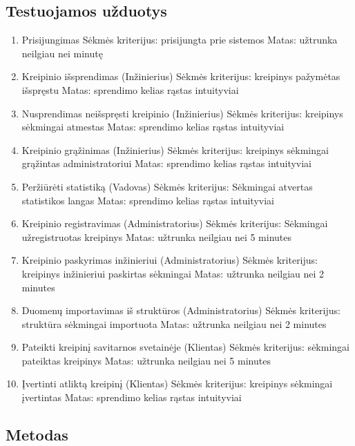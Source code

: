 	\subsection{Testuojamos užduotys}
	
		\begin{enumerate}
			\item Prisijungimas
				\subitem Sėkmės kriterijus: prisijungta prie sistemos
				\subitem Matas: užtrunka neilgiau nei minutę
			\item Kreipinio išsprendimas (Inžinierius)
				\subitem Sėkmės kriterijus: kreipinys pažymėtas išspręstu
				\subitem Matas: sprendimo kelias rąstas intuityviai
			\item Nusprendimas neišspręsti kreipinio (Inžinierius)
				\subitem Sėkmės kriterijus: kreipinys sėkmingai atmestas
				\subitem Matas: sprendimo kelias rąstas intuityviai
			\item Kreipinio grąžinimas (Inžinierius)
				\subitem Sėkmės kriterijus: kreipinys sėkmingai grąžintas administratoriui
				\subitem Matas: sprendimo kelias rąstas intuityviai
			\item Peržiūrėti statistiką (Vadovas)
				\subitem Sėkmės kriterijus: Sėkmingai atvertas statistikos langas
				\subitem Matas: sprendimo kelias rąstas intuityviai
			\item Kreipinio registravimas (Administratorius)
				\subitem Sėkmės kriterijus: Sėkmingai užregistruotas kreipinys
				\subitem Matas: užtrunka neilgiau nei 5 minutes
			\item Kreipinio paskyrimas inžinieriui (Administratorius)
				\subitem Sėkmės kriterijus: kreipinys inžinieriui paskirtas sėkmingai
				\subitem Matas: užtrunka neilgiau nei 2 minutes
			\item Duomenų importavimas iš struktūros (Administratorius)
				\subitem Sėkmės kriterijus: struktūra sėkmingai importuota
				\subitem Matas: užtrunka neilgiau nei 2 minutes
			\item Pateikti kreipinį savitarnos svetainėje (Klientas)
				\subitem Sėkmės kriterijus: sėkmingai pateiktas kreipinys
				\subitem Matas: užtrunka neilgiau nei 5 minutes
			\item Įvertinti atliktą kreipinį (Klientas)
				\subitem Sėkmės kriterijus: kreipinys sėkmingai įvertintas
				\subitem Matas: sprendimo kelias rąstas intuityviai
		\end{enumerate}
	
	\subsection{Metodas}
	
